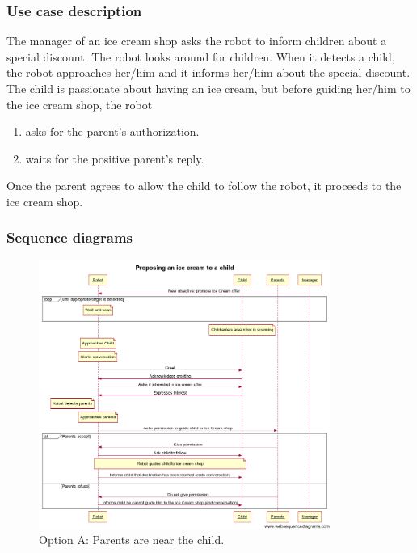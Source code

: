 \subsubsection{Use case description}

The manager of an ice cream shop asks the robot to inform children about
a special discount. The robot looks around for children. When it detects
a child, the robot approaches her/him and it informs her/him
about the special discount. The child
is passionate about having an ice cream, but before guiding her/him
to the ice cream shop, the robot
\begin{enumerate}
\item asks for the parent's authorization.
\item waits for the positive parent's reply.
\end{enumerate}

\noindent Once the parent agrees to allow the child to follow the robot, it proceeds
to the ice cream shop.

\subsubsection{Sequence diagrams}

\begin{figure}[!h]
\includegraphics[width=0.85\textwidth]{iceCreamA}
\protect\caption{Option A: Parents are near the child.}
\end{figure}


